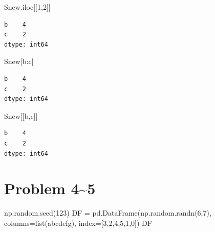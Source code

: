 \documentclass[
  a4paper,
  DIV=11,
  numbers=noendperiod]{scrreprt}
\newenvironment{Shaded}{\begin{snugshade}}{\end{snugshade}}
\newcommand{\BuiltInTok}[1]{\textcolor[rgb]{0.00,0.23,0.31}{#1}}
\newcommand{\DecValTok}[1]{\textcolor[rgb]{0.68,0.00,0.00}{#1}}
\newcommand{\NormalTok}[1]{\textcolor[rgb]{0.00,0.23,0.31}{#1}}
\newcommand{\OperatorTok}[1]{\textcolor[rgb]{0.37,0.37,0.37}{#1}}
\newcommand{\StringTok}[1]{\textcolor[rgb]{0.13,0.47,0.30}{#1}}
\begin{document}
\begin{Shaded}
\begin{Highlighting}[]
\NormalTok{Snew.iloc[[}\DecValTok{1}\NormalTok{,}\DecValTok{2}\NormalTok{]]}
\end{Highlighting}
\end{Shaded}

\begin{verbatim}
b    4
c    2
dtype: int64
\end{verbatim}

\begin{Shaded}
\begin{Highlighting}[]
\NormalTok{Snew[}\StringTok{\textquotesingle{}b\textquotesingle{}}\NormalTok{:}\StringTok{\textquotesingle{}c\textquotesingle{}}\NormalTok{]}
\end{Highlighting}
\end{Shaded}

\begin{verbatim}
b    4
c    2
dtype: int64
\end{verbatim}

\begin{Shaded}
\begin{Highlighting}[]
\NormalTok{Snew[[}\StringTok{\textquotesingle{}b\textquotesingle{}}\NormalTok{,}\StringTok{\textquotesingle{}c\textquotesingle{}}\NormalTok{]]}
\end{Highlighting}
\end{Shaded}

\begin{verbatim}
b    4
c    2
dtype: int64
\end{verbatim}

\section*{Problem 4\textasciitilde5}\label{problem-45}


\begin{Shaded}
\begin{Highlighting}[]
\NormalTok{np.random.seed(}\DecValTok{123}\NormalTok{)}
\NormalTok{DF }\OperatorTok{=}\NormalTok{ pd.DataFrame(np.random.randn(}\DecValTok{6}\NormalTok{,}\DecValTok{7}\NormalTok{),}
\NormalTok{                  columns}\OperatorTok{=}\BuiltInTok{list}\NormalTok{(}\StringTok{\textquotesingle{}abcdefg\textquotesingle{}}\NormalTok{),}
\NormalTok{                  index}\OperatorTok{=}\NormalTok{[}\DecValTok{3}\NormalTok{,}\DecValTok{2}\NormalTok{,}\DecValTok{4}\NormalTok{,}\DecValTok{5}\NormalTok{,}\DecValTok{1}\NormalTok{,}\DecValTok{0}\NormalTok{])}
\NormalTok{DF}
\end{Highlighting}
\end{Shaded}
\end{document}
